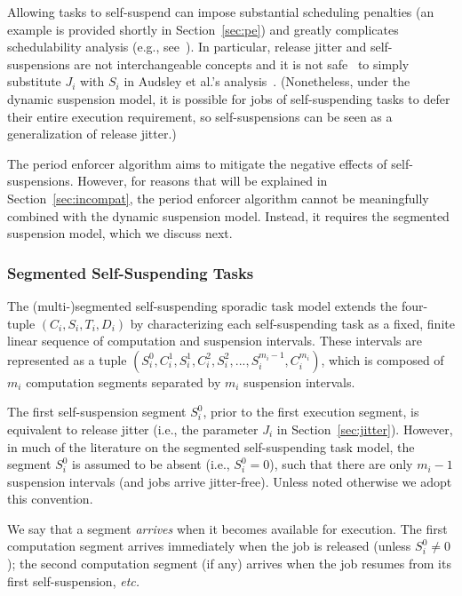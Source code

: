 Allowing tasks to self-suspend can impose substantial scheduling penalties (an example is provided shortly in Section~\ref{sec:pe}) and greatly complicates  schedulability analysis (e.g., see~\cite{ecrts15nelissen,Ri:04,Chen2016}). In particular, release jitter and self-suspensions are not interchangeable concepts and it is not safe~\cite{Chen2016,ecrts15nelissen} to simply substitute $J_i$ with $S_i$ in Audsley et al.'s analysis~\cite{ABRTW:93}. (Nonetheless, under the dynamic suspension model, it is possible for jobs of self-suspending tasks to defer their entire execution requirement, so self-suspensions can be seen as a generalization of release jitter.)

The period enforcer algorithm aims to mitigate the negative effects of self-suspensions. However, for reasons that will be explained in Section~\ref{sec:incompat}, the period enforcer algorithm cannot be meaningfully combined with the dynamic suspension model. Instead, it requires the segmented suspension model, which we discuss next.


\subsubsection{Segmented Self-Suspending Tasks}
\label{sec:segmented}

The (multi-)segmented self-suspending sporadic task model extends the  four-tuple $(C_i,S_i,T_i,D_i)$ by characterizing each self-suspending task as a fixed, finite linear sequence of computation and suspension intervals. These intervals are represented as a tuple
$(S_{i}^0,C_{i}^1,S_{i}^1,C_{i}^2,S_{i}^2,...,S_{i}^{m_i-1},C_{i}^{m_i})$, which is composed of $m_i$ computation segments separated by $m_i$ suspension intervals.

The first self-suspension segment $S_i^0$, prior to the first execution segment, is equivalent to release jitter (i.e., the parameter $J_i$ in Section~\ref{sec:jitter}). However, in much of the literature on the segmented self-suspending task model, the segment $S_i^0$ is assumed to be absent (i.e., $S_i^0 = 0$), such that there are only $m_i - 1$ suspension intervals (and jobs arrive jitter-free). Unless noted otherwise we adopt this convention.

We say that a segment \emph{arrives} when it becomes available for execution. The first computation segment arrives immediately when the job is released (unless $S_i^0 \neq 0$); the second computation segment (if any) arrives when the job resumes from its first self-suspension, \textit{etc.}


